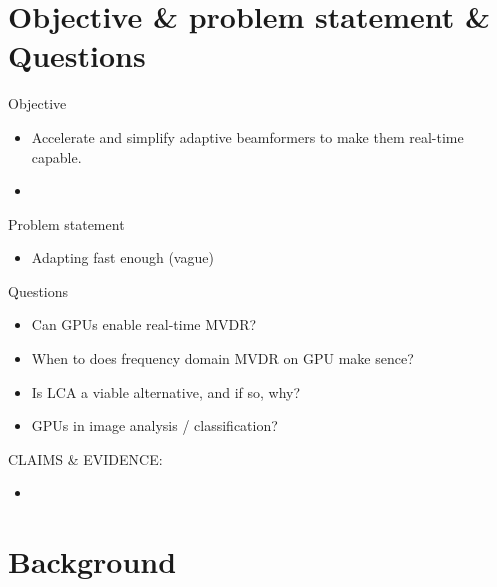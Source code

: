 \section{Objective \& problem statement \& Questions}
Objective
\begin{itemize}
\item Accelerate and simplify adaptive beamformers to make them real-time capable.
\item 
\end{itemize}
Problem statement
\begin{itemize}
\item Adapting fast enough (vague)
\end{itemize}
Questions
\begin{itemize}
  \item Can GPUs enable real-time MVDR?
  \item When to does frequency domain MVDR on GPU make sence?
  \item Is LCA a viable alternative, and if so, why?
  \item GPUs in image analysis / classification?
\end{itemize}

CLAIMS \& EVIDENCE:
\begin{itemize}
\item 
\end{itemize}

\section{Background}
\ifIncludeWritingTips
\begin{markdown}
\end{markdown}
\fi

